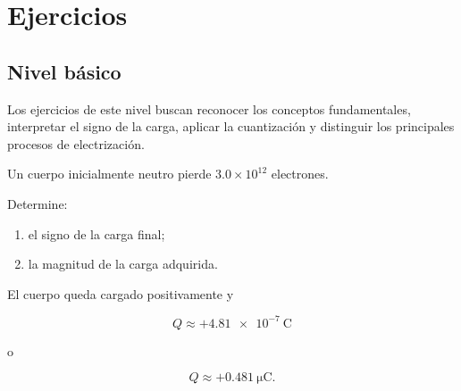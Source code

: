 
\section{Ejercicios}



\subsection{Nivel básico}

Los ejercicios de este nivel buscan reconocer los conceptos fundamentales,
interpretar el signo de la carga, aplicar la cuantización y distinguir los
principales procesos de electrización.



\begin{ejercicio}

Un cuerpo inicialmente neutro pierde \(3.0\times10^{12}\) electrones.

Determine:

\begin{enumerate}
    \item el signo de la carga final;
    \item la magnitud de la carga adquirida.
\end{enumerate}

\end{ejercicio}

\begin{respuesta}

El cuerpo queda cargado positivamente y

\[
\boxed{
Q\approx+\SI{4.81e-7}{\coulomb}
}
\]

o

\[
\boxed{
Q\approx+\SI{0.481}{\micro\coulomb}
}.
\]

\end{respuesta}

